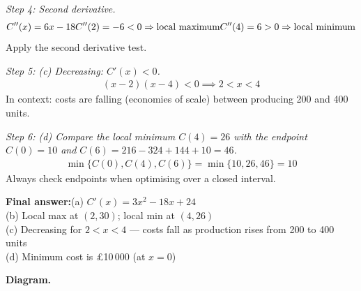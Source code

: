 \documentclass[11pt]{article}
\begin{document}
\textit{Step 4: Second derivative.}
\[\begin{gathered}
C''(x) = 6x - 18 \newline C''(2) = -6 < 0 \Rightarrow \text{local maximum} \newline C''(4) = 6 > 0 \Rightarrow \text{local minimum}
\end{gathered}\]
Apply the second derivative test.

\textit{Step 5: (c) Decreasing: \( C'(x) < 0 \).}
\[\begin{gathered}
(x-2)(x-4) < 0 \implies 2 < x < 4
\end{gathered}\]
In context: costs are falling (economies of scale) between producing 200 and 400 units.

\textit{Step 6: (d) Compare the local minimum \( C(4) = 26 \) with the endpoint \( C(0) = 10 \) and \( C(6) = 216 - 324 + 144 + 10 = 46 \).}
\[\begin{gathered}
\min\{C(0), C(4), C(6)\} = \min\{10, 26, 46\} = 10
\end{gathered}\]
Always check endpoints when optimising over a closed interval.

\begin{answerbox}
\textbf{Final answer:}\quad (a) \(\displaystyle  C'(x) = 3x^2-18x+24 \) \\[3pt]  (b) Local max at \(\displaystyle  (2, 30) \); local min at \(\displaystyle  (4, 26) \) \\[3pt]  (c) Decreasing for \(\displaystyle  2 < x < 4 \) --- costs fall as production rises from 200 to 400 units \\[3pt]  (d) Minimum cost is \pounds 10\,000 (at \(\displaystyle  x = 0 \))
\end{answerbox}
\textbf{Diagram.}
\end{document}
